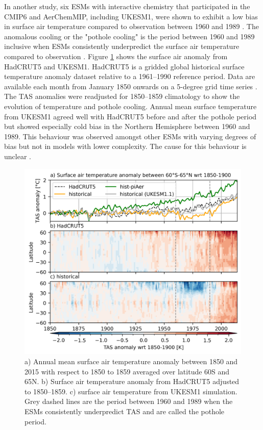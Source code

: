In another study, six ESMs with interactive chemistry that participated in the CMIP6 and AerChemMIP, including UKESM1, were shown to exhibit a low bias in surface air temperature compared to observation between 1960 and 1989 \citep{zhangRoleAnthropogenicAerosols2021}. The anomalous cooling or the "pothole cooling" is the period between 1960 and 1989 inclusive when ESMs consistently underpredict the surface air temperature compared to observation \citep{zhangRoleAnthropogenicAerosols2021}. Figure \ref{fig:ch4:seasonal-tas-anomaly} shows the surface air anomaly from HadCRUT5 and UKESM1. HadCRUT5 is a gridded global historical surface temperature anomaly dataset relative to a 1961--1990 reference period. Data are available each month from January 1850 onwards on a 5-degree grid time series \citep{moriceUpdatedAssessmentSurface2021}. The TAS anomalies were readjusted for 1850--1859 climatology to show the evolution of temperature and pothole cooling. Annual mean surface temperature from UKESM1 agreed well with HadCRUT5 before and after the pothole period but showed especially cold bias in the Northern Hemisphere between 1960 and 1989. This behaviour was observed amongst other ESMs with varying degrees of bias but not in models with lower complexity. The cause for this behaviour is unclear \citep{zhangRoleAnthropogenicAerosols2021}.


\begin{figure}
    \centering
    \includegraphics{Chapter4/Figs/TAS_anomaly_cropped.png}
    \caption[Surface air anomaly from HadCRUT5, UKESM1, and UKESM1.1 between 1850 and 2015]{a) Annual mean surface air temperature anomaly between 1850 and 2015 with respect to 1850 to 1859 averaged over latitude 60\textdegree S and 65\textdegree N. b) Surface air temperature anomaly from HadCRUT5 adjusted to 1850--1859. c) surface air temperature from UKESM1 \hist{} simulation. Grey dashed lines are the period between 1960 and 1989 when the ESMs consistently underpredict TAS and are called the pothole period.}
    \label{fig:ch4:seasonal-tas-anomaly}
\end{figure}


